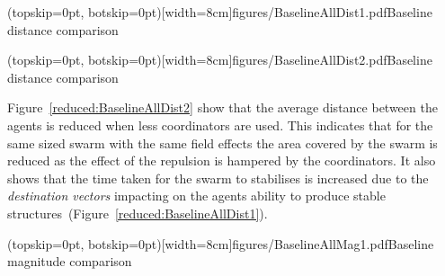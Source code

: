 \documentclass{ieeeaccess}
\begin{document}

\Figure[t!](topskip=0pt, botskip=0pt)[width=8cm]{figures/BaselineAllDist1.pdf}{Baseline distance comparison\label{reduced:BaselineAllDist1}}


\Figure[t!](topskip=0pt, botskip=0pt)[width=8cm]{figures/BaselineAllDist2.pdf}{Baseline distance comparison\label{reduced:BaselineAllDist2}}

Figure~\ref{reduced:BaselineAllDist2} show that the average distance between the agents is reduced when less coordinators are used. This indicates that for the same sized swarm with the same field effects the area covered by the swarm is reduced as the effect of the repulsion is hampered by the coordinators. It also shows that the time taken for the swarm to stabilises is increased due to the \textit{destination vectors} impacting on the agents ability to produce stable structures~(Figure~\ref{reduced:BaselineAllDist1}). 


\Figure[t!](topskip=0pt, botskip=0pt)[width=8cm]{figures/BaselineAllMag1.pdf}{Baseline magnitude comparison\label{reduced:BaselineAllMag1}}

\end{document}

